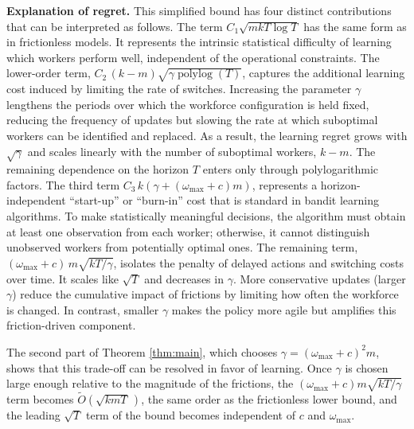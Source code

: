\documentclass[opre,blindrev]{informs3}
\newcommand{\polylog}{\operatorname{polylog}}
\begin{document}
{\bf Explanation of regret.} This simplified bound has four distinct contributions that can be interpreted as follows. The term \(C_1 \sqrt{mkT\log T}\) has the same form as in frictionless models. It represents the intrinsic statistical difficulty of learning which workers perform well, independent of the operational constraints. The lower-order term, \(C_2\,(k-m)\sqrt{\gamma \polylog(T)}\), captures the additional learning cost induced by limiting the rate of switches. Increasing the parameter \(\gamma\) lengthens the periods over which the workforce configuration is held fixed, reducing the frequency of updates but slowing the rate at which suboptimal workers can be identified and replaced. As a result, the learning regret grows with \(\sqrt{\gamma}\) and scales linearly with the number of suboptimal workers, \(k-m\). The remaining dependence on the horizon \(T\) enters only through polylogarithmic factors. The third term \(C_3\,k\left(\gamma + (\omega_{\max}+c)m\right)\), 
represents a horizon-independent ``start-up'' or ``burn-in'' cost that is standard in bandit learning algorithms. To make statistically meaningful decisions, the algorithm must obtain at least one observation from each worker; otherwise, it cannot distinguish unobserved workers from potentially optimal ones. 
The remaining term, \((\omega_{\max}+c)\,m\sqrt{{kT}/{\gamma}}\), isolates the penalty of delayed actions and switching costs over time. It scales like \(\sqrt{T}\) and decreases in \(\gamma\). More conservative updates (larger \(\gamma\)) reduce the cumulative impact of frictions by limiting how often the workforce is changed. In contrast, smaller \(\gamma\) makes the policy more agile but amplifies this friction-driven component. 

The second part of Theorem \ref{thm:main}, which chooses \(\gamma = (\omega_{\max}+c)^2 m\), shows that this trade-off can be resolved in favor of learning. Once \(\gamma\) is chosen large enough relative to the magnitude of the frictions, the \((\omega_{\max}+c)m\sqrt{kT/\gamma}\) term becomes \(\tilde{O}(\sqrt{kmT}\,)\), the same order as the frictionless lower bound, and the leading \(\sqrt{T}\) term of the bound becomes independent of \(c\) and \(\omega_{\max}\).
\end{document}
